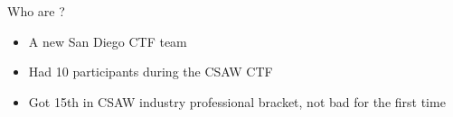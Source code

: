 \begin{frame}{Who are \VaporSec?}
    \begin{itemize}
        \item A new \Aesthetic San Diego CTF team
        \item Had 10 participants during the CSAW CTF
        \item Got 15th in CSAW industry professional bracket, not bad for
              the first time
    \end{itemize}
\end{frame}
